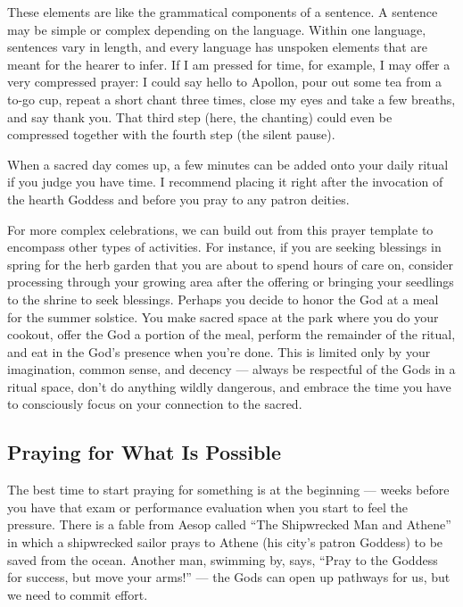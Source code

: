 \documentclass[
]{book}
\begin{document}
These elements are like the grammatical components of a sentence. A sentence may be simple or complex depending on the language. Within one language, sentences vary in length, and every language has unspoken elements that are meant for the hearer to infer. If I am pressed for time, for example, I may offer a very compressed prayer: I could say hello to Apollon, pour out some tea from a to-go cup, repeat a short chant three times, close my eyes and take a few breaths, and say thank you. That third step (here, the chanting) could even be compressed together with the fourth step (the silent pause).

When a sacred day comes up, a few minutes can be added onto your daily ritual if you judge you have time. I recommend placing it right after the invocation of the hearth Goddess and before you pray to any patron deities.

For more complex celebrations, we can build out from this prayer template to encompass other types of activities. For instance, if you are seeking blessings in spring for the herb garden that you are about to spend hours of care on, consider processing through your growing area after the offering or bringing your seedlings to the shrine to seek blessings. Perhaps you decide to honor the God at a meal for the summer solstice. You make sacred space at the park where you do your cookout, offer the God a portion of the meal, perform the remainder of the ritual, and eat in the God's presence when you're done. This is limited only by your imagination, common sense, and decency --- always be respectful of the Gods in a ritual space, don't do anything wildly dangerous, and embrace the time you have to consciously focus on your connection to the sacred.

\hypertarget{praying-for-what-is-possible}{%
\subsection{Praying for What Is Possible}\label{praying-for-what-is-possible}}

The best time to start praying for something is at the beginning --- weeks before you have that exam or performance evaluation when you start to feel the pressure. There is a fable from Aesop called ``The Shipwrecked Man and Athene'' in which a shipwrecked sailor prays to Athene (his city's patron Goddess) to be saved from the ocean. Another man, swimming by, says, ``Pray to the Goddess for success, but move your arms!'' --- the Gods can open up pathways for us, but we need to commit effort.
\end{document}
